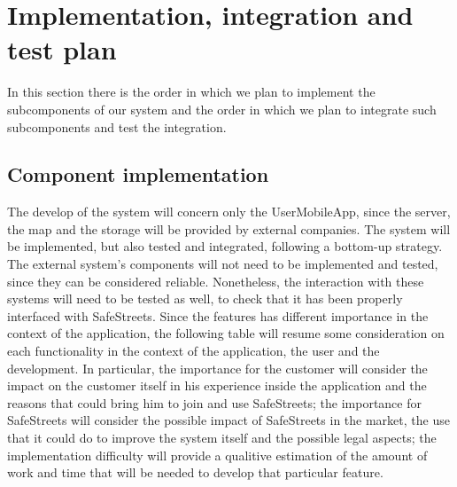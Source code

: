 \documentclass[../RASD.tex]{subfiles}
\begin{document}
    \chapter{Implementation, integration and test plan}\label{ch:implementation,-integration-and-test-plan}
    In this section there is the order in which we plan to implement the subcomponents of our system and the order in which we plan to integrate such subcomponents and test the integration.
    \newpage
    \section{Component implementation}\label{sec:component-implementation}
    The develop of the system will concern only the UserMobileApp, since the server, the map and the storage will be provided by external companies. The system will be implemented, but also tested and integrated, following a bottom-up strategy.
    The external system’s components will not need to be implemented and tested, since they can be considered reliable. Nonetheless, the interaction with these systems will need to be tested as well, to check that it has been properly interfaced with SafeStreets.
    Since the features has different importance in the context of the application, the following table will resume some consideration on each functionality in the context of the application, the user and the development. In particular, the importance for the customer will consider the impact on the customer itself in his experience inside the application and the reasons that could bring him to join and use SafeStreets; the importance for SafeStreets will consider the possible impact of SafeStreets in the market, the use that it could do to improve the system itself and the possible legal aspects; the implementation difficulty will provide a qualitive estimation of the amount of work and time that will be needed to develop that particular feature.
\end{document}
